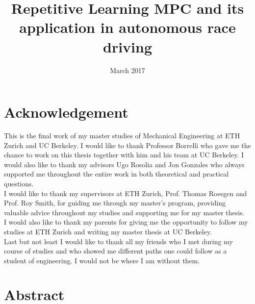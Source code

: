 \documentclass[10pt,twoside,a4paper,fleqn]{report}
\title{Repetitive Learning MPC and its application in autonomous race driving}
\date{March 2017}
\theoremstyle{definition}
\begin{document}
\maketitle 							%

\setcounter{tocdepth}{2}
\tableofcontents
 \cleardoublepage

\chapter*{Acknowledgement}
This is the final work of my master studies of Mechanical Engineering at ETH Zurich and UC Berkeley. I would like to thank Professor Borrelli who gave me the chance to work on this thesis together with him and his team at UC Berkeley. I would also like to thank my advisors Ugo Rosolia and Jon Gonzales who always supported me throughout the entire work in both theoretical and practical questions.\\
I would like to thank my supervisors at ETH Zurich, Prof. Thomas Roesgen and Prof. Roy Smith, for guiding me through my master's program, providing valuable advice throughout my studies and supporting me for my master thesis.\\
I would also like to thank my parents for giving me the opportunity to follow my studies at ETH Zurich and writing my master thesis at UC Berkeley.\\
Last but not least I would like to thank all my friends who I met during my course of studies and who showed me different paths one could follow as a student of engineering. I would not be where I am without them.
 \cleardoublepage
 
\chapter*{Abstract}
\end{document}
